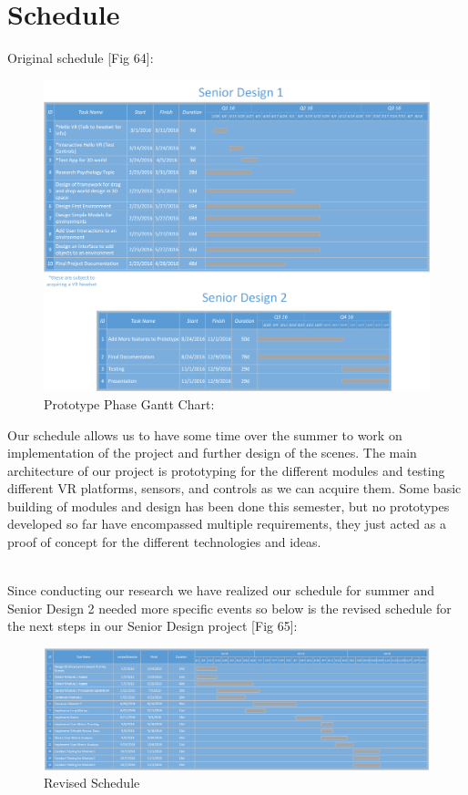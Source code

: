 \documentclass[a4paper,10pt]{article}
\begin{document}
	\section{Schedule}
	Original schedule [Fig 64]:
	\begin{figure}[H]
		\includegraphics[width=\linewidth]{scheduleSR.png}
		\caption{Prototype Phase Gantt Chart:}
		\label{fig:pchart}
	\end{figure}
	\pagebreak
	
	Our schedule allows us to have some time over the summer to work on implementation of the project and further design of the scenes. The main architecture of our project is
	prototyping for the different modules and testing different VR platforms, sensors, and controls as we can acquire them. Some basic building of modules and design has been done
	this semester, but no prototypes developed so far have encompassed multiple requirements, they just acted as a proof of concept for the different technologies and ideas.
	\par~\\
	Since conducting our research we have realized our schedule for summer and Senior Design 2 needed more specific events so below is the revised schedule for the next steps in our Senior Design project [Fig 65]:
	
	\begin{figure}[H]
		\centerline{\includegraphics[scale=0.42, angle=90]{revisedSchedule.png}}
		\caption{Revised Schedule}
		\label{fig:revisedSchedule}
	\end{figure}
	
\end{document}
